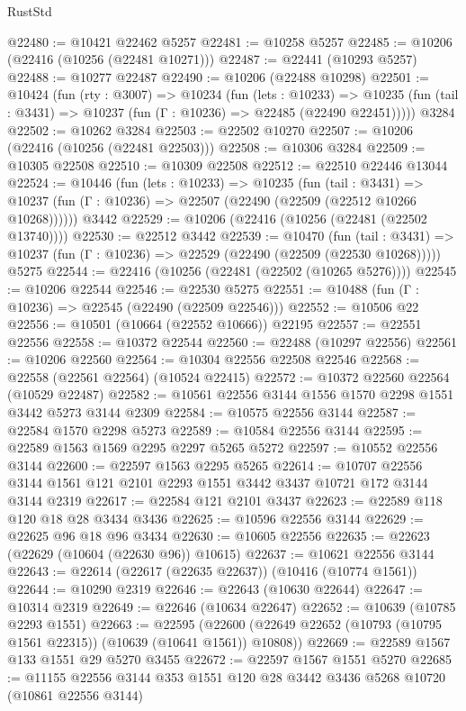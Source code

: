 \begin{lexlean}{RustStd}
\begin{coremodule}
@22480 := @10421 @22462 @5257
@22481 := @10258 @5257
@22485 := @10206 (@22416 (@10256 (@22481 @10271)))
@22487 := @22441 (@10293 @5257)
@22488 := @10277 @22487
@22490 := @10206 (@22488 @10298)
@22501 := @10424
    (fun (rty : @3007) =>
    @10234
      (fun (lets : @10233) =>
      @10235 (fun (tail : @3431) => @10237 (fun (Γ : @10236) => @22485 (@22490 @22451)))))
    @3284
@22502 := @10262 @3284
@22503 := @22502 @10270
@22507 := @10206 (@22416 (@10256 (@22481 @22503)))
@22508 := @10306 @3284
@22509 := @10305 @22508
@22510 := @10309 @22508
@22512 := @22510 @22446 @13044
@22524 := @10446
    (fun (lets : @10233) =>
    @10235
      (fun (tail : @3431) =>
      @10237 (fun (Γ : @10236) => @22507 (@22490 (@22509 (@22512 @10266 @10268))))))
    @3442
@22529 := @10206 (@22416 (@10256 (@22481 (@22502 @13740))))
@22530 := @22512 @3442
@22539 := @10470
    (fun (tail : @3431) => @10237 (fun (Γ : @10236) => @22529 (@22490 (@22509 (@22530 @10268)))))
    @5275
@22544 := @22416 (@10256 (@22481 (@22502 (@10265 @5276))))
@22545 := @10206 @22544
@22546 := @22530 @5275
@22551 := @10488 (fun (Γ : @10236) => @22545 (@22490 (@22509 @22546)))
@22552 := @10506 @22
@22556 := @10501 (@10664 (@22552 @10666)) @22195
@22557 := @22551 @22556
@22558 := @10372 @22544
@22560 := @22488 (@10297 @22556)
@22561 := @10206 @22560
@22564 := @10304 @22556 @22508 @22546
@22568 := @22558 (@22561 @22564) (@10524 @22415)
@22572 := @10372 @22560 @22564 (@10529 @22487)
@22582 := @10561 @22556 @3144 @1556 @1570 @2298 @1551 @3442 @5273 @3144 @2309
@22584 := @10575 @22556 @3144
@22587 := @22584 @1570 @2298 @5273
@22589 := @10584 @22556 @3144
@22595 := @22589 @1563 @1569 @2295 @2297 @5265 @5272
@22597 := @10552 @22556 @3144
@22600 := @22597 @1563 @2295 @5265
@22614 := @10707 @22556 @3144 @1561 @121 @2101 @2293 @1551 @3442 @3437 @10721 @172 @3144 @3144 @2319
@22617 := @22584 @121 @2101 @3437
@22623 := @22589 @118 @120 @18 @28 @3434 @3436
@22625 := @10596 @22556 @3144
@22629 := @22625 @96 @18 @96 @3434
@22630 := @10605 @22556
@22635 := @22623 (@22629 (@10604 (@22630 @96)) @10615)
@22637 := @10621 @22556 @3144
@22643 := @22614 (@22617 (@22635 @22637)) (@10416 (@10774 @1561))
@22644 := @10290 @2319
@22646 := @22643 (@10630 @22644)
@22647 := @10314 @2319
@22649 := @22646 (@10634 @22647)
@22652 := @10639 (@10785 @2293 @1551)
@22663 := @22595
    (@22600 (@22649 @22652 (@10793 (@10795 @1561 @22315)) (@10639 (@10641 @1561)) @10808))
@22669 := @22589 @1567 @133 @1551 @29 @5270 @3455
@22672 := @22597 @1567 @1551 @5270
@22685 := @11155 @22556 @3144 @353 @1551 @120 @28 @3442 @3436 @5268 @10720 (@10861 @22556 @3144)

\end{coremodule}
\end{lexlean}
